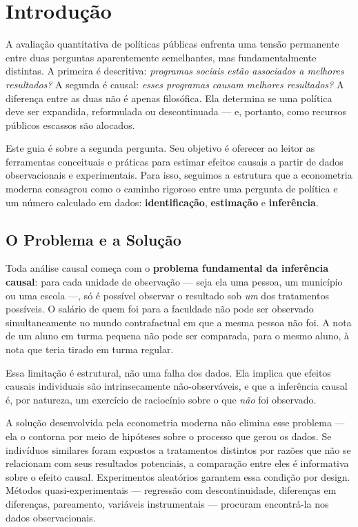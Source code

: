 \chapter{Introdução}
\label{cap:introducao}

A avaliação quantitativa de políticas públicas enfrenta uma tensão permanente
entre duas perguntas aparentemente semelhantes, mas fundamentalmente distintas.
A primeira é descritiva: \textit{programas sociais estão associados a melhores
resultados?} A segunda é causal: \textit{esses programas causam melhores
resultados?} A diferença entre as duas não é apenas filosófica. Ela determina
se uma política deve ser expandida, reformulada ou descontinuada --- e,
portanto, como recursos públicos escassos são alocados.

Este guia é sobre a segunda pergunta. Seu objetivo é oferecer ao leitor as
ferramentas conceituais e práticas para estimar efeitos causais a partir de
dados observacionais e experimentais. Para isso, seguimos a estrutura que a
econometria moderna consagrou como o caminho rigoroso entre uma pergunta de
política e um número calculado em dados: \textbf{identificação},
\textbf{estimação} e \textbf{inferência}.


\section{O Problema e a Solução}

Toda análise causal começa com o \textbf{problema fundamental da inferência
causal}: para cada unidade de observação --- seja ela uma pessoa, um município
ou uma escola ---, só é possível observar o resultado sob \textit{um} dos
tratamentos possíveis. O salário de quem foi para a faculdade não pode ser
observado simultaneamente no mundo contrafactual em que a mesma pessoa não foi.
A nota de um aluno em turma pequena não pode ser comparada, para o mesmo aluno,
à nota que teria tirado em turma regular.

Essa limitação é estrutural, não uma falha dos dados. Ela implica que efeitos
causais individuais são intrinsecamente não-observáveis, e que a inferência
causal é, por natureza, um exercício de raciocínio sobre o que
\textit{não} foi observado.

A solução desenvolvida pela econometria moderna não elimina esse problema ---
ela o contorna por meio de hipóteses sobre o processo que gerou os dados. Se
indivíduos similares foram expostos a tratamentos distintos por razões que não
se relacionam com seus resultados potenciais, a comparação entre eles é
informativa sobre o efeito causal. Experimentos aleatórios garantem essa
condição por design. Métodos quasi-experimentais --- regressão com
descontinuidade, diferenças em diferenças, pareamento, variáveis instrumentais
--- procuram encontrá-la nos dados observacionais.


